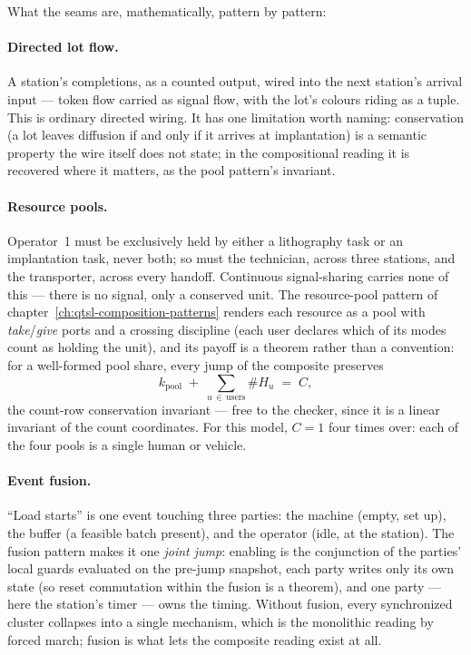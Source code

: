 What the seams are, mathematically, pattern by pattern:

\paragraph{Directed lot flow.} A station's completions, as a counted
output, wired into the next station's arrival input --- token flow
carried as signal flow, with the lot's colours riding as a tuple. This
is ordinary directed wiring. It has one limitation worth naming:
conservation (a lot leaves diffusion if and only if it arrives at
implantation) is a semantic property the wire itself does not state;
in the compositional reading it is recovered where it matters, as the
pool pattern's invariant.

\paragraph{Resource pools.} Operator~1 must be exclusively held by
either a lithography task or an implantation task, never both; so
must the technician, across three stations, and the transporter,
across every handoff. Continuous signal-sharing carries none of this
--- there is no signal, only a conserved unit. The resource-pool
pattern of chapter~\ref{ch:qtsl-composition-patterns} renders each
resource as a pool with \emph{take}/\emph{give} ports and a crossing
discipline (each user declares which of its modes count as holding
the unit), and its payoff is a theorem rather than a convention: for
a well-formed pool share, every jump of the composite preserves
\[
  k_{\mathrm{pool}} \;+\; \sum_{u \,\in\, \mathrm{users}} \#H_u \;=\; C,
\]
the count-row conservation invariant --- free to the checker, since
it is a linear invariant of the count coordinates. For this model,
$C = 1$ four times over: each of the four pools is a single human or
vehicle.

\paragraph{Event fusion.} ``Load starts'' is one event touching three
parties: the machine (empty, set up), the buffer (a feasible batch
present), and the operator (idle, at the station). The fusion pattern
makes it one \emph{joint jump}: enabling is the conjunction of the
parties' local guards evaluated on the pre-jump snapshot, each party
writes only its own state (so reset commutation within the fusion is
a theorem), and one party --- here the station's timer --- owns the
timing. Without fusion, every synchronized cluster collapses into a
single mechanism, which is the monolithic reading by forced march;
fusion is what lets the composite reading exist at all.

